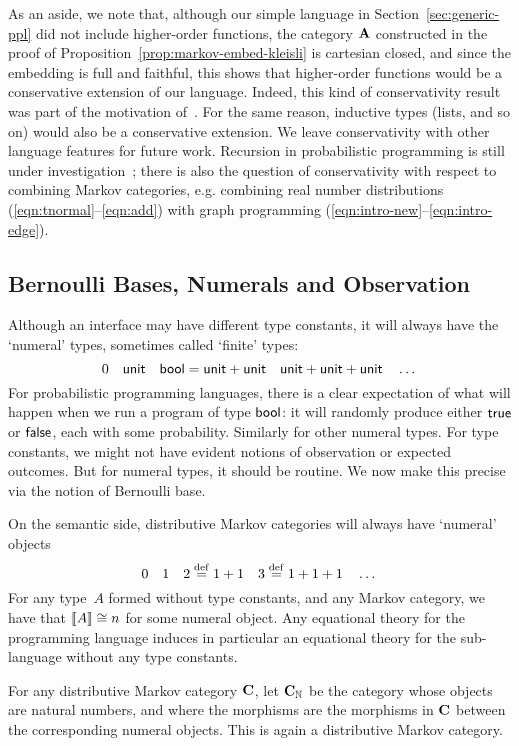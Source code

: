 As an aside, we note that, although our simple language in Section~\ref{sec:generic-ppl} did not include higher-order functions, the category $\mathbf{A}$ constructed in the proof of Proposition~\ref{prop:markov-embed-kleisli} is cartesian closed, and since the embedding is full and faithful, this shows that higher-order functions would be a conservative extension of our language. Indeed, this kind of conservativity result was part of the motivation of~\cite{power-universal}.
For the same reason, inductive types (lists, and so on) would also be a conservative extension. 
We leave conservativity with other language features for future work. Recursion in probabilistic programming is still under investigation~\cite{DBLP:conf/lics/JiaLMZ21,DBLP:conf/lics/MatacheMS22,DBLP:journals/pacmpl/VakarKS19,DBLP:journals/corr/abs-2106-16190,DBLP:journals/pacmpl/EhrhardPT18}; there is also the question of conservativity with respect to combining Markov categories, e.g. combining real number distributions (\eqref{eqn:tnormal}--\eqref{eqn:add}) with graph programming (\eqref{eqn:intro-new}--\eqref{eqn:intro-edge}).


\subsection{Bernoulli Bases, Numerals and Observation}\label{sec:bernoulli-base}
Although an interface may have different type constants, it will
always have the `numeral' types, sometimes called `finite' types:
\[
0\quad  \mathsf{unit} \quad \mathsf{bool}=\mathsf{unit}+\mathsf{unit} \quad \mathsf{unit}+\mathsf{unit}+\mathsf{unit}\quad\dots
\]
For probabilistic programming languages, there is a clear expectation
of what will happen when we run a program of type $\mathsf{bool}$: it will
randomly produce either $\mathsf{true}$ or $\mathsf{false}$, each with some
probability. Similarly for other
numeral types. For type constants, we might not have evident notions of
observation or expected outcomes. But for numeral types, it should be
routine. We now make this precise via the notion of Bernoulli base. 

On the semantic side, distributive Markov categories will always have `numeral' objects
\[
  0\quad 1\quad 2\stackrel {\mathrm{def}}=1+1\quad 3\stackrel {\mathrm{def}}= 1+1+1\quad\dots
\]
For any type~$A$ formed without type constants, and any Markov
category, we have
that $\llbracket A\rrbracket\cong n$ for some numeral object.
Any equational theory for the programming language induces in
particular an equational theory for the sub-language without any type
constants.

\begin{proposition}
  For any distributive Markov category $\mathbf{C}$, let $\mathbf{C}_{\mathbb{N}}$ be the category whose objects are natural numbers, and where the morphisms are the morphisms in $\mathbf{C}$ between the corresponding numeral objects.
  This
  is again a distributive Markov category.
\end{proposition}

